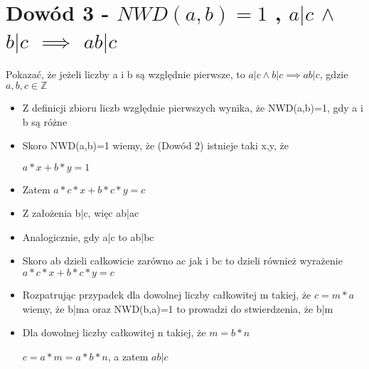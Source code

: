 \documentclass[a4paper, 12pt]{article}
\begin{document}
\section{Dowód 3 - \(NWD(a,b)=1\) ,  \(a|c \)  \(\wedge\) \(b|c\) \(\implies\) \(ab|c\)} 
Pokazać, że jeżeli liczby a i b są względnie pierwsze, to \(a|c \wedge b|c \implies ab|c\), gdzie \( a,b,c \in \mathbb{Z} \)
\begin{itemize}

\item Z definicji zbioru liczb względnie pierwszych wynika, że NWD(a,b)=1, gdy a i b są różne

\item Skoro NWD(a,b)=1 wiemy, że (Dowód 2) istnieje taki x,y, że

 \(a*x+b*y=1\)

\item Zatem \(a*c*x+b*c*y=c\)

\item Z założenia b|c, więc ab|ac

\item Analogicznie, gdy a|c to ab|bc

\item Skoro ab dzieli całkowicie zarówno ac jak i bc to dzieli również wyrażenie \(a*c*x+b*c*y=c\)

\item Rozpatrując przypadek dla dowolnej liczby całkowitej m takiej, że \(c=m*a\) wiemy, że b|ma oraz NWD(b,a)=1 to prowadzi do stwierdzenia, że b|m

\item Dla dowolnej liczby całkowitej n takiej, że \(m=b*n\)   

\( c=a*m=a*b*n \), a zatem \(ab|c\)
\end{itemize}
\newpage
\end{document}
